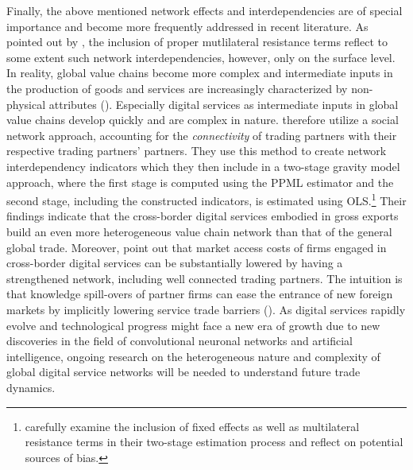 Finally, the above mentioned network effects and interdependencies are of special importance and become more frequently addressed in recent literature. As pointed out by \textcite{understanding_2023}, the inclusion of proper mutlilateral resistance terms reflect to some extent such network interdependencies, however, only on the surface level. In reality, global value chains become more complex and intermediate inputs in the production of goods and services are increasingly characterized by non-physical attributes (\cite{understanding_2023}). Especially digital services as intermediate inputs in global value chains develop quickly and are complex in nature. \textcite{understanding_2023} therefore utilize a social network approach, accounting for the \textit{connectivity} of trading partners with their respective trading partners' partners. They use this method to create network interdependency indicators which they then include in a two-stage gravity model approach, where the first stage is computed using the PPML estimator and the second stage, including the constructed indicators, is estimated using OLS.\footnote{\textcite{understanding_2023} carefully examine the inclusion of fixed effects as well as multilateral resistance terms in their two-stage estimation process and reflect on potential sources of bias.} Their findings indicate that the cross-border digital services embodied in gross exports build an even more heterogeneous value chain network than that of the general global trade. Moreover, \textcite{understanding_2023} point out that market access costs of firms engaged in cross-border digital services can be substantially lowered by having a strengthened network, including well connected trading partners. The intuition is that knowledge spill-overs of partner firms can ease the entrance of new foreign markets by implicitly lowering service trade barriers (\cite{understanding_2023}). As digital services rapidly evolve and technological progress might face a new era of growth due to new discoveries in the field of convolutional neuronal networks and artificial intelligence, ongoing research on the heterogeneous nature and complexity of global digital service networks will be needed to understand future trade dynamics.











